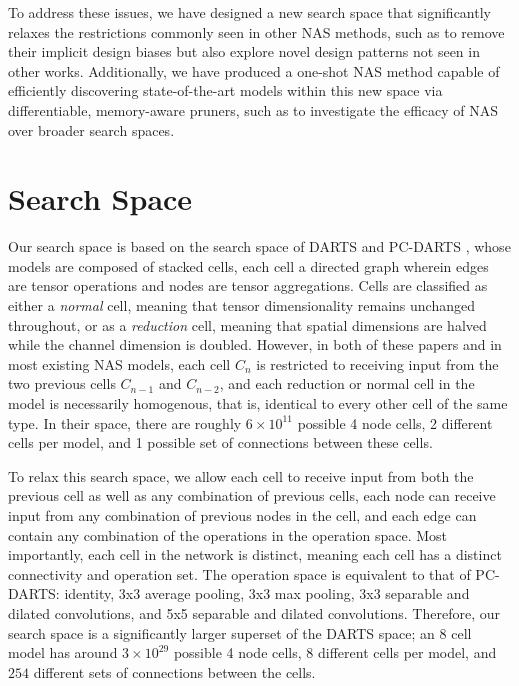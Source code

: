 \documentclass[10pt,twocolumn,letterpaper]{article}
\begin{document}
To address these issues, we have designed a new search space that significantly relaxes the restrictions commonly seen in other NAS methods, such as to remove their implicit design biases but also explore novel design patterns not seen in other works.  Additionally, we have produced a one-shot NAS method capable of efficiently discovering state-of-the-art models within this new space via differentiable, memory-aware pruners, such as to investigate the efficacy of NAS over broader search spaces. 
 
\section{Search Space}
Our search space is based on the search space of DARTS \cite{liu2019} and PC-DARTS \cite{xu2020}, whose models are composed of stacked cells, each cell a directed graph wherein edges are tensor operations and nodes are tensor aggregations. Cells are classified as either a \textit{normal} cell, meaning that tensor dimensionality remains unchanged throughout, or as a \textit{reduction} cell, meaning that spatial dimensions are halved while the channel dimension is doubled. However, in both of these papers and in most existing NAS models, each cell $C_n$ is restricted to receiving input from the two previous cells $C_{n-1}$ and $C_{n-2}$, and each reduction or normal cell in the model is necessarily homogenous, that is, identical to every other cell of the same type. In their space, there are roughly $6\times10^{11}$ possible 4 node cells, 2 different cells per model, and 1 possible set of connections between these cells.

To relax this search space, we allow each cell to receive input from both the previous cell as well as any combination of previous cells, each node can receive input from any combination of previous nodes in the cell, and each edge can contain any combination of the operations in the operation space. Most importantly, each cell in the network is distinct, meaning each cell has a distinct connectivity and operation set. The operation space is equivalent to that of PC-DARTS: identity, 3x3 average pooling, 3x3 max pooling, 3x3 separable and dilated convolutions, and 5x5 separable and dilated convolutions. Therefore, our search space is a significantly larger superset of the DARTS space; an 8 cell model has around $3 \times 10^{29}$ possible 4 node cells, 8 different cells per model, and $254$ different sets of connections between the cells.
\end{document}
